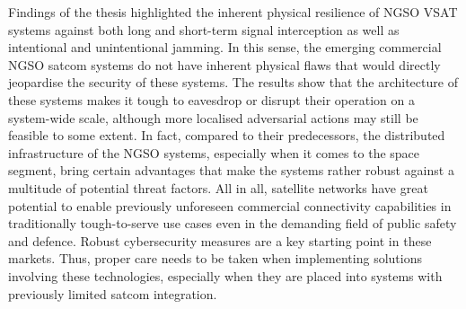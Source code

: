 \documentclass[english, 12pt, a4paper, elec, utf8, a-1b, online]{aaltothesis}
\begin{document}
Findings of the thesis highlighted the inherent physical resilience of NGSO VSAT systems against both long and short-term signal interception as well as intentional and unintentional jamming.
In this sense, the emerging commercial NGSO satcom systems do not have inherent physical flaws that would directly jeopardise the security of these systems.
The results show that the architecture of these systems makes it tough to eavesdrop or disrupt their operation on a system-wide scale, although more localised adversarial actions may still be feasible to some extent.
In fact, compared to their predecessors, the distributed infrastructure of the NGSO systems, especially when it comes to the space segment, bring certain advantages that make the systems rather robust against a multitude of potential threat factors.
All in all, satellite networks have great potential to enable previously unforeseen commercial connectivity capabilities in traditionally tough-to-serve use cases even in the demanding field of public safety and defence.
Robust cybersecurity measures are a key starting point in these markets.
Thus, proper care needs to be taken when implementing solutions involving these technologies, especially when they are placed into systems with previously limited satcom integration.



\clearpage

\thesisbibliography




\clearpage

\thesisappendix

\end{document}
